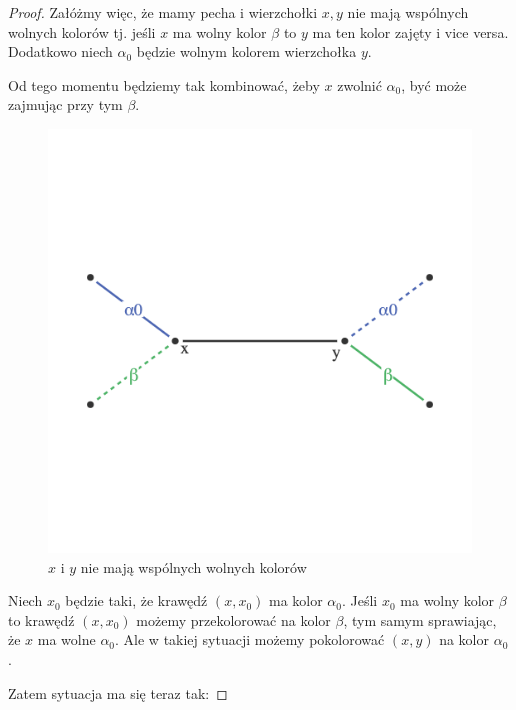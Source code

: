 \begin{proof}
        Załóżmy więc, że mamy pecha i wierzchołki $x, y$ nie mają wspólnych wolnych kolorów tj. jeśli $x$ ma wolny kolor $\beta$
        to $y$ ma ten kolor zajęty i vice versa. Dodatkowo niech $\alpha_0$ będzie wolnym kolorem wierzchołka $y$.
        
        Od tego momentu będziemy tak kombinować, żeby $x$ zwolnić $\alpha_0$, być może zajmując przy tym $\beta$.
        
        \begin{figure}[H]
            \centering
            \includegraphics[scale=0.6]{chapters/dyskretna/colours/vizing/images/pre_step_one.png}
            \caption{$x$ i $y$ nie mają wspólnych wolnych kolorów}
        \end{figure}
        
        
        Niech $x_0$ będzie taki, że krawędź $(x, x_0)$ ma kolor $\alpha_0$. Jeśli $x_0$ ma wolny kolor $\beta$
        to krawędź $(x, x_0)$ możemy przekolorować na kolor $\beta$,
        tym samym sprawiając, że $x$ ma wolne $\alpha_0$.
        Ale w takiej sytuacji możemy pokolorować $(x, y)$ na kolor $\alpha_0$. 
        
        Zatem sytuacja ma się teraz tak:
        

\end{proof}
